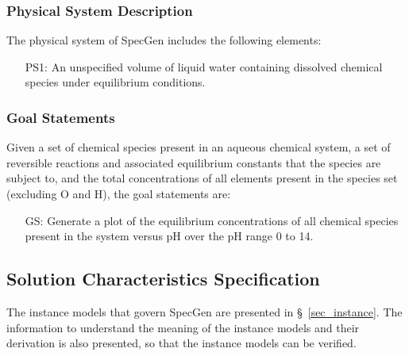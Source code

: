 \documentclass[12pt]{article}
\newcounter{goalnum} %
\newcommand{\sref}[1]{\S~\ref{#1}}
\newcommand{\progname}{SpecGen} %
\begin{document}
\subsubsection{Physical System Description}

The physical system of \progname{} includes the following elements:

\begin{itemize}
\item[PS1:] An unspecified volume of liquid water containing dissolved chemical 
  species under equilibrium conditions.
\end{itemize}


\subsubsection{Goal Statements}

\noindent Given a set of chemical species present in an aqueous chemical system, 
a set of reversible reactions and associated equilibrium constants that the 
species are subject to, and the total concentrations of all elements present in 
the species set (excluding O and H), the goal statements are:

\begin{itemize}

\item[GS\refstepcounter{goalnum}\thegoalnum \label{G_plot}:] Generate a plot of 
  the equilibrium concentrations of all chemical species present in the system 
  versus pH over the pH range 0 to 14.
\end{itemize}


\subsection{Solution Characteristics Specification}

The instance models that govern \progname{} are presented in 
\sref{sec_instance}. The information to understand the meaning of the instance 
models and their derivation is also presented, so that the instance models can 
be verified.
\end{document}
